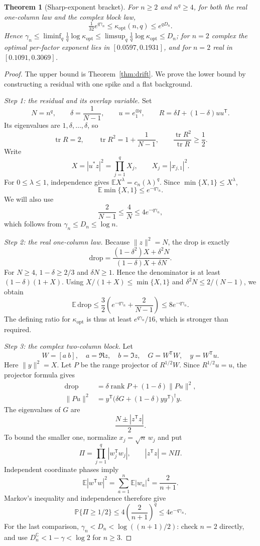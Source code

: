 \documentclass[11pt,a4paper]{article}
\newtheorem{theorem}{Theorem}[section]
\theoremstyle{definition}\newtheorem{definition}[theorem]{Definition}
\theoremstyle{remark}\newtheorem{remark}[theorem]{Remark}
\numberwithin{equation}{section}
\newcommand{\E}{\mathbb E}
\newcommand{\Prob}{\mathbb P}
\newcommand{\C}{\mathbb C}
\newcommand{\tr}{\operatorname{tr}}
\newcommand{\rank}{\operatorname{rank}}
\newcommand{\opt}{\mathrm{opt}}
\begin{document}
\begin{theorem}[Sharp-exponent bracket]\label{thm:bracket}
For $n\ge2$ and $n^q\ge4$, for both the real one-column law and the complex block law,
\[
 \tfrac1{32}e^{q\gamma_n}\le\kappa_\opt(n,q)\le e^{qD_n}.
\]
Hence $\gamma_n\le\liminf_q\frac1q\log\kappa_\opt\le\limsup_q\frac1q\log\kappa_\opt\le D_n$; for
$n=2$ complex the optimal per-factor exponent lies in $[0.0597,0.1931]$, and for
$n=2$ real in $[0.1091,0.3069]$.
\end{theorem}

\begin{proof}
The upper bound is Theorem~\ref{thm:drift}. We prove the lower bound
by constructing a residual with one spike and a flat background.

\emph{Step 1: the residual and its overlap variable.}
Set
\[
 N=n^q,\qquad
 \delta=\frac1{N-1},\qquad
 u=e_1^{\otimes q},\qquad
 R=\delta I+(1-\delta)uu^{\mathsf T}.
\]
Its eigenvalues are \(1,\delta,\ldots,\delta\), so
\[
 \tr R=2,\qquad
 \tr R^2=1+\frac1{N-1},\qquad
 \frac{\tr R^2}{\tr R}\ge\frac12.
\]
Write
\[
 X=|u^*z|^2=\prod_{j=1}^q X_j,
 \qquad X_j=|x_{j,1}|^2.
\]
For \(0\le\lambda\le1\), independence gives
\(\E X^\lambda=c_n(\lambda)^q\).
Since \(\min\{X,1\}\le X^\lambda\),
\begin{equation}\label{eq:chernoff}
 \E\min\{X,1\}\le e^{-q\gamma_n}.
\end{equation}
We will also use
\[
 \frac2{N-1}\le\frac4N\le4e^{-q\gamma_n},
\]
which follows from \(\gamma_n\le D_n\le\log n\).

\emph{Step 2: the real one-column law.}
Because \(\|z\|^2=N\), the drop is exactly
\[
 \mathrm{drop}
 =\frac{(1-\delta^2)X+\delta^2N}
        {(1-\delta)X+\delta N}.
\]
For \(N\ge4\), \(1-\delta\ge2/3\) and \(\delta N\ge1\).
Hence the denominator is at least \((1-\delta)(1+X)\).
Using \(X/(1+X)\le\min\{X,1\}\) and
\(\delta^2N\le2/(N-1)\), we obtain
\[
 \E\,\mathrm{drop}
 \le\frac32\left(e^{-q\gamma_n}+\frac2{N-1}\right)
 \le8e^{-q\gamma_n}.
\]
The defining ratio for \(\kappa_\opt\) is thus at least
\(e^{q\gamma_n}/16\), which is stronger than required.

\emph{Step 3: the complex two-column block.}
Let
\[
 W=[a\ b],\quad a=\Re z,\quad b=\Im z,\quad
 G=W^{\mathsf T}W,\quad y=W^{\mathsf T}u.
\]
Here \(\|y\|^2=X\). Let \(P\) be the range projector of \(R^{1/2}W\).
Since \(R^{1/2}u=u\), the projector formula gives
\begin{align*}
 \mathrm{drop}
 &=\delta\rank P+(1-\delta)\|Pu\|^2,\\
 \|Pu\|^2
 &=y^{\mathsf T}
   \bigl(\delta G+(1-\delta)yy^{\mathsf T}\bigr)^\dagger y.
\end{align*}
The eigenvalues of \(G\) are
\[
 \frac{N\pm|z^{\mathsf T}z|}{2}.
\]
To bound the smaller one, normalize \(x_j=\sqrt n\,w_j\) and put
\[
 \Pi=\prod_{j=1}^q|w_j^{\mathsf T}w_j|,
 \qquad |z^{\mathsf T}z|=N\Pi.
\]
Independent coordinate phases imply
\[
 \E|w^{\mathsf T}w|^2
 =\sum_{a=1}^n\E|w_a|^4=\frac2{n+1}.
\]
Markov's inequality and independence therefore give
\[
 \Prob\{\Pi\ge1/2\}
 \le4\left(\frac2{n+1}\right)^q
 \le4e^{-q\gamma_n}.
\]
For the last comparison, \(\gamma_n<D_n<\log((n+1)/2)\):
check \(n=2\) directly, and use
\(D_n^{\C}<1-\gamma<\log2\) for \(n\ge3\).


\end{proof}
\end{document}
